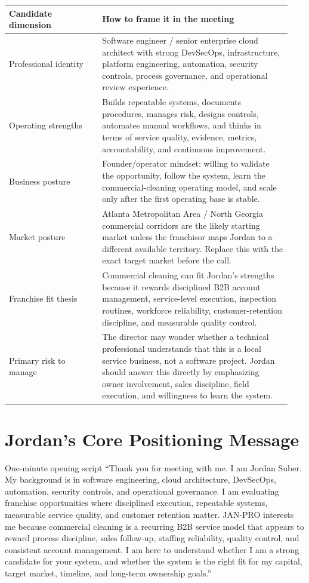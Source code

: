 \documentclass[11pt]{article}
\newcommand{\janpro}{JAN-PRO}
\begin{document}
\begin{longtable}{>{\raggedright\arraybackslash}p{0.31\linewidth}>{\raggedright\arraybackslash}p{0.63\linewidth}}
\toprule
\textbf{Candidate dimension} & \textbf{How to frame it in the meeting} \\
\midrule
Professional identity & Software engineer / senior enterprise cloud architect with strong DevSecOps, infrastructure, platform engineering, automation, security controls, process governance, and operational review experience. \\
Operating strengths & Builds repeatable systems, documents procedures, manages risk, designs controls, automates manual workflows, and thinks in terms of service quality, evidence, metrics, accountability, and continuous improvement. \\
Business posture & Founder/operator mindset: willing to validate the opportunity, follow the system, learn the commercial-cleaning operating model, and scale only after the first operating base is stable. \\
Market posture & Atlanta Metropolitan Area / North Georgia commercial corridors are the likely starting market unless the franchisor maps Jordan to a different available territory. Replace this with the exact target market before the call. \\
Franchise fit thesis & Commercial cleaning can fit Jordan's strengths because it rewards disciplined B2B account management, service-level execution, inspection routines, workforce reliability, customer-retention discipline, and measurable quality control. \\
Primary risk to manage & The director may wonder whether a technical professional understands that this is a local service business, not a software project. Jordan should answer this directly by emphasizing owner involvement, sales discipline, field execution, and willingness to learn the system. \\
\bottomrule
\end{longtable}

\section{Jordan's Core Positioning Message}

\begin{scriptbox}{One-minute opening script}
``Thank you for meeting with me. I am Jordan Suber. My background is in software engineering, cloud architecture, DevSecOps, automation, security controls, and operational governance. I am evaluating franchise opportunities where disciplined execution, repeatable systems, measurable service quality, and customer retention matter. \janpro{} interests me because commercial cleaning is a recurring B2B service model that appears to reward process discipline, sales follow-up, staffing reliability, quality control, and consistent account management. I am here to understand whether I am a strong candidate for your system, and whether the system is the right fit for my capital, target market, timeline, and long-term ownership goals.''
\end{scriptbox}
\end{document}
